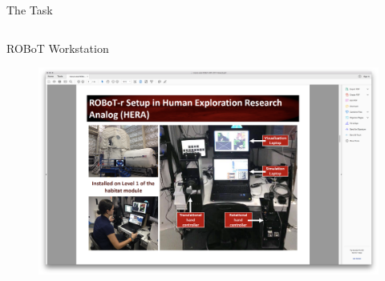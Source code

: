 \documentclass[10pt]{beamer}
\begin{document}
\begin{frame}[fragile]{The Task}
\begin{columns}[T]
\begin{column}{\textwidth}
    \end{column}
  \end{columns}
\end{frame}

\begin{frame}[fragile]{ROBoT Workstation}
\begin{figure}
  \begin{center}
    \includegraphics[trim={13cm 5cm 22cm 15.5cm},clip,width=\linewidth]{../img/Screen_Shot_2018-07-26_at_1.43.16_PM.png}
  \end{center}
\end{figure}
\end{frame}
\end{document}
